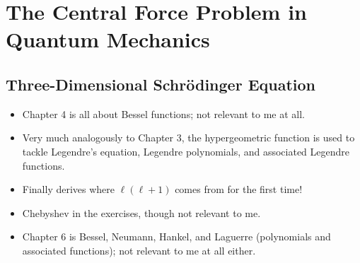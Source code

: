 \documentclass[../finalProject.tex]{subfiles}
\begin{document}
\section{The Central Force Problem in Quantum Mechanics}
\subsection{Three-Dimensional Schr\"{o}dinger Equation}
\begin{itemize}
    \item {}Chapter 4 is all about Bessel functions; not relevant to me at all.
    \item Very much analogously to Chapter 3, the hypergeometric function is used to tackle Legendre's equation, Legendre polynomials, and associated Legendre functions.
    \item Finally derives where $\ell(\ell+1)$ comes from for the first time!
    \item Chebyshev in the exercises, though not relevant to me.
    \item Chapter 6 is Bessel, Neumann, Hankel, and Laguerre (polynomials and associated functions); not relevant to me at all either.
\end{itemize}
\end{document}

